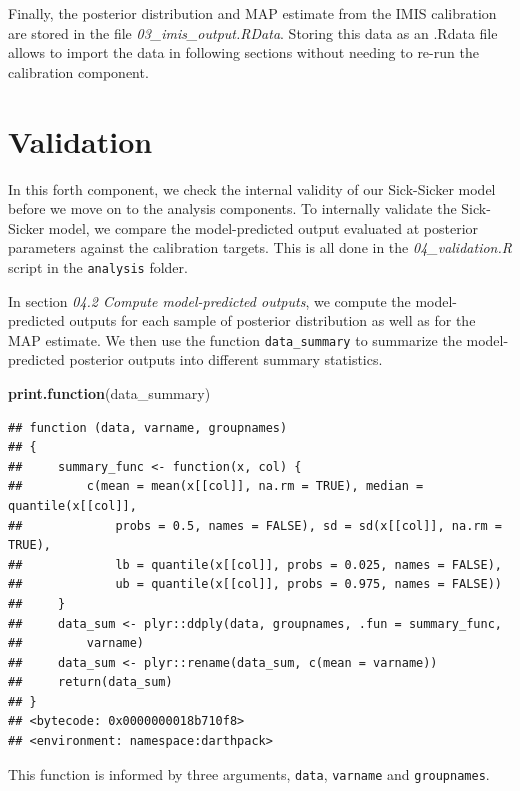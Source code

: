 \documentclass[]{book}
\newenvironment{Shaded}{\begin{snugshade}}{\end{snugshade}}
\newcommand{\KeywordTok}[1]{\textcolor[rgb]{0.13,0.29,0.53}{\textbf{#1}}}
\newcommand{\NormalTok}[1]{#1}
\begin{document}
Finally, the posterior distribution and MAP estimate from the IMIS calibration are stored in the file \emph{03\_imis\_output.RData}. Storing this data as an .Rdata file allows to import the data in following sections without needing to re-run the calibration component.

\hypertarget{validation}{%
\chapter{Validation}\label{validation}}

In this forth component, we check the internal validity of our Sick-Sicker model before we move on to the analysis components. To internally validate the Sick-Sicker model, we compare the model-predicted output evaluated at posterior parameters against the calibration targets. This is all done in the \emph{04\_validation.R} script in the \texttt{analysis} folder.

In section \emph{04.2 Compute model-predicted outputs}, we compute the model-predicted outputs for each sample of posterior distribution as well as for the MAP estimate. We then use the function \texttt{data\_summary} to summarize the model-predicted posterior outputs into different summary statistics.

\begin{Shaded}
\begin{Highlighting}[]
\KeywordTok{print.function}\NormalTok{(data_summary)}
\end{Highlighting}
\end{Shaded}

\begin{verbatim}
## function (data, varname, groupnames) 
## {
##     summary_func <- function(x, col) {
##         c(mean = mean(x[[col]], na.rm = TRUE), median = quantile(x[[col]], 
##             probs = 0.5, names = FALSE), sd = sd(x[[col]], na.rm = TRUE), 
##             lb = quantile(x[[col]], probs = 0.025, names = FALSE), 
##             ub = quantile(x[[col]], probs = 0.975, names = FALSE))
##     }
##     data_sum <- plyr::ddply(data, groupnames, .fun = summary_func, 
##         varname)
##     data_sum <- plyr::rename(data_sum, c(mean = varname))
##     return(data_sum)
## }
## <bytecode: 0x0000000018b710f8>
## <environment: namespace:darthpack>
\end{verbatim}

This function is informed by three arguments, \texttt{data}, \texttt{varname} and \texttt{groupnames}.
\end{document}
